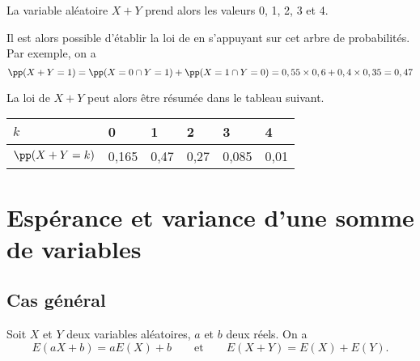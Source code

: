 \documentclass[11pt,fleqn, openany]{book} %
\begin{document}
\begin{example}
\begin{center}
\end{center}

La variable aléatoire $X+Y$ prend alors les valeurs 0, 1, 2, 3 et 4.

Il est alors possible d'établir la loi de  en s'appuyant sur cet arbre de probabilités. Par exemple, on a
\[\pp(X+Y=1)=\pp(X=0 \cap Y=1)+\pp(X=1 \cap Y=0)=0,55 \times 0,6 + 0,4 \times 0,35=0,47\]

La loi de $X+Y$ peut alors être résumée dans le tableau suivant.

\renewcommand{\arraystretch}{1.5}
\begin{center}
\begin{tabularx}{0.7\linewidth}{|l|X|X|X|X|X|}
\hline
$k$ & 0 & 1 & 2 & 3 & 4 \\
\hline
$\pp(X+Y=k)$ & 0,165 & 0,47 & 0,27 & 0,085&0,01 \\
\hline
\end{tabularx}

\end{center}
\vspace{-0,5cm}
\end{example}



\section{Espérance et variance d'une somme de variables}

\subsection{Cas général}

\begin{proposition}Soit $X$ et $Y$ deux variables aléatoires, $a$ et $b$ deux réels. On a
\[E(aX+b)=aE(X) + b \qquad \text{et} \qquad E(X+Y)=E(X)+ E(Y).\]
\vspace{-0,5cm}\end{proposition}
\end{document}
